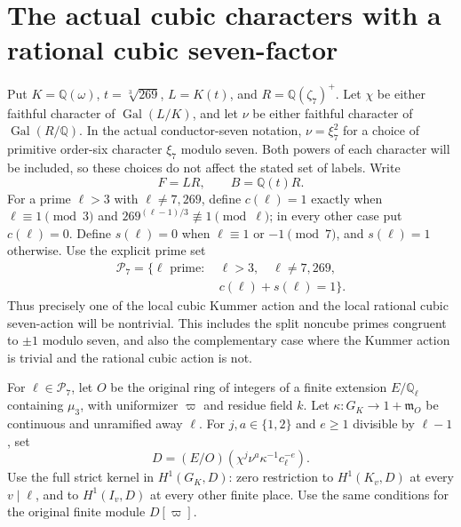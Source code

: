 \section{The actual cubic characters with a rational cubic seven-factor}
\label{sec:mixed-cubic-seven-cubic-strict}

Put $K=\mathbb Q(\omega)$, $t=\sqrt[3]{269}$, $L=K(t)$,
and $R=\mathbb Q(\zeta_7)^+$.  Let $\chi$ be either faithful
character of $\operatorname{Gal}(L/K)$, and let $\nu$ be
either faithful character of $\operatorname{Gal}(R/\mathbb Q)$.
In the actual conductor-seven notation, $\nu=\xi_7^2$ for
a choice of primitive order-six character $\xi_7$ modulo seven.
Both powers of each character will be included, so these
choices do not affect the stated set of labels.
Write
\[
              F=LR,\qquad B=\mathbb Q(t)R.
 \tag{MC7.1}
\]
For a prime $\ell>3$ with $\ell\ne7,269$, define
$c(\ell)=1$ exactly when $\ell\equiv1\pmod3$ and
$269^{(\ell-1)/3}\not\equiv1\pmod\ell$; in every other
case put $c(\ell)=0$.  Define $s(\ell)=0$ when
$\ell\equiv1$ or $-1\pmod7$, and $s(\ell)=1$ otherwise.
Use the explicit prime set
\[
 \begin{split}
 \mathscr P_7=\{\ell\text{ prime}:\ &\ell>3,\quad\ell\ne7,269,\\
                                    &c(\ell)+s(\ell)=1\}.
 \end{split}
 \tag{MC7.2}
\]
Thus precisely one of the local cubic Kummer action and the
local rational cubic seven-action will be nontrivial.
This includes the split noncube primes congruent to $\pm1$
modulo seven, and also the complementary case where the
Kummer action is trivial and the rational cubic action is not.

For $\ell\in\mathscr P_7$, let $O$ be the original ring of
integers of a finite extension $E/\mathbb Q_\ell$ containing
$\mu_3$, with uniformizer $\varpi$ and residue field $k$.
Let $\kappa:G_K\to1+\mathfrak m_O$ be continuous and
unramified away $\ell$.  For $j,a\in\{1,2\}$ and $e\geq1$
divisible by $\ell-1$, set
\[
            D=(E/O)(\chi^j\nu^a\kappa^{-1}c_\ell^{-e}).
 \tag{MC7.3}
\]
Use the full strict kernel in $H^1(G_K,D)$: zero restriction
to $H^1(K_v,D)$ at every $v\mid\ell$, and to $H^1(I_v,D)$
at every other finite place.  Use the same conditions for
the original finite module $D[\varpi]$.

